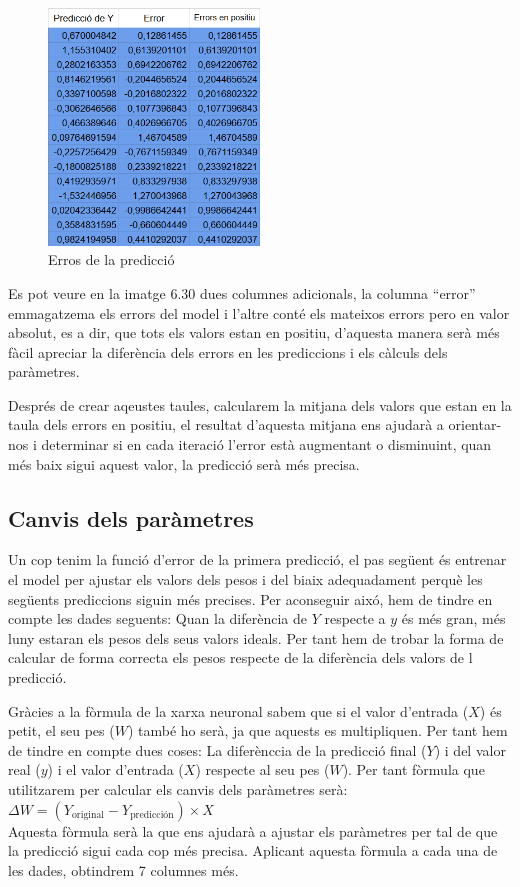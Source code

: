 \begin{figure}[H]
    \centering
    \includegraphics[width=0.5\textwidth]{./figures/Errors.png}
    \caption{Erros de la predicció}
\end{figure}

Es pot veure en la imatge 6.30 dues columnes adicionals, la columna ``error'' emmagatzema els errors del model i l'altre conté els mateixos errors pero en valor absolut, es a dir, que tots els valors estan en positiu, d'aquesta manera serà més fàcil apreciar la diferència dels errors en les prediccions i els càlculs dels paràmetres.

Després de crear aqeustes taules, calcularem la mitjana dels valors que estan en la taula dels errors en positiu, el resultat d'aquesta mitjana ens ajudarà a orientar-nos i determinar si en cada iteració l'error està augmentant o disminuint, quan més baix sigui aquest valor, la predicció serà més precisa.
\subsection{Canvis dels paràmetres}
Un cop tenim la funció d'error de la primera predicció, el pas següent és entrenar el model per ajustar els valors dels pesos i del biaix adequadament perquè les següents prediccions siguin més precises.
Per aconseguir aixó, hem de tindre en compte les dades seguents: Quan la diferència de $Y$ respecte a $y$ és més gran, més luny estaran els pesos dels seus valors ideals. Per tant hem de trobar la forma de calcular de forma correcta els pesos respecte de la diferència dels valors de l predicció.

Gràcies a la fòrmula de la xarxa neuronal sabem que si el valor d'entrada ($X$) és petit, el seu pes ($W$) també ho serà, ja que aquests es multipliquen. Per tant hem de tindre en compte dues coses: La diferènccia de la predicció final ($Y$) i del valor real ($y$) i el valor d'entrada ($X$) respecte al seu pes ($W$). Per tant fòrmula que utilitzarem per calcular els canvis dels paràmetres serà:\\
$\Delta W = (Y_{\text{original}} - Y_{\text{predicción}}) \times X$\\
Aquesta fòrmula serà la que ens ajudarà a ajustar els paràmetres per tal de que la predicció sigui cada cop més precisa. Aplicant aquesta fòrmula a cada una de les dades, obtindrem 7 columnes més.

